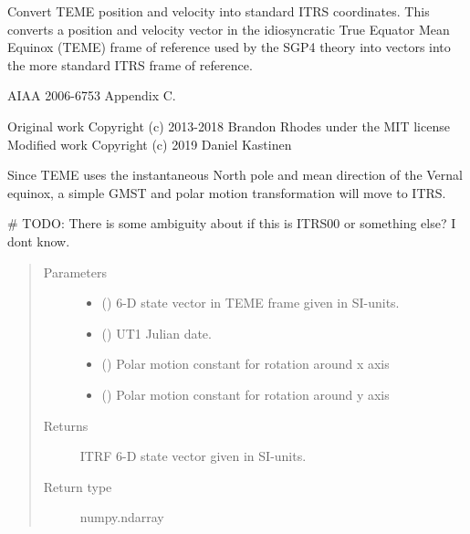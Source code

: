 \documentclass[letterpaper,10pt,english]{sphinxmanual}
\begin{document}
\begin{fulllineitems}
\label{\detokenize{modules/TLE_tools:TLE_tools.TEME_to_ITRF}}
Convert TEME position and velocity into standard ITRS coordinates.
This converts a position and velocity vector in the idiosyncratic
True Equator Mean Equinox (TEME) frame of reference used by the SGP4
theory into vectors into the more standard ITRS frame of reference.

 AIAA 2006-6753 Appendix C.

Original work Copyright (c) 2013-2018 Brandon Rhodes under the MIT license
Modified work Copyright (c) 2019 Daniel Kastinen

Since TEME uses the instantaneous North pole and mean direction
of the Vernal equinox, a simple GMST and polar motion transformation will move to ITRS.

\# TODO: There is some ambiguity about if this is ITRS00 or something else? I dont know.
\begin{quote}\begin{description}
\item[{Parameters}] \leavevmode\begin{itemize}
\item {} 
 () \textendash{} 6-D state vector in TEME frame given in SI-units.

\item {} 
 () \textendash{} UT1 Julian date.

\item {} 
 () \textendash{} Polar motion constant for rotation around x axis

\item {} 
 () \textendash{} Polar motion constant for rotation around y axis

\end{itemize}

\item[{Returns}] \leavevmode
ITRF 6-D state vector given in SI-units.

\item[{Return type}] \leavevmode
numpy.ndarray

\end{description}\end{quote}

\end{fulllineitems}
\end{document}
